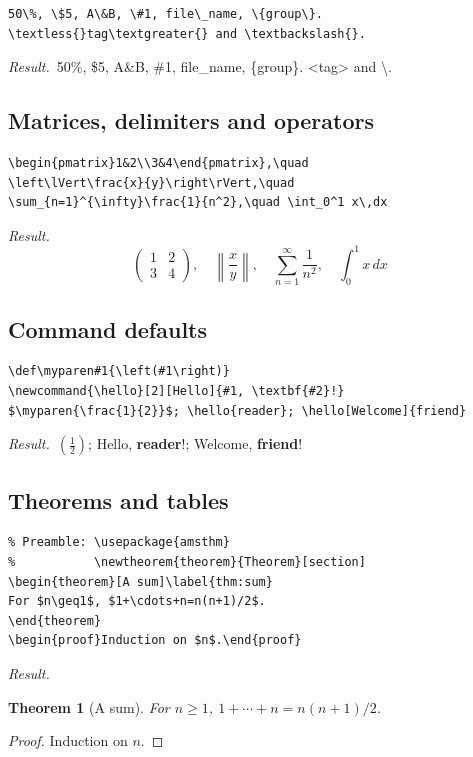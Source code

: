 \documentclass[11pt]{article}
\newtheorem{theorem}{Theorem}[section]
\newcommand{\result}{\par\noindent\textit{Result.}\ }
\begin{document}
\begin{verbatim}
50\%, \$5, A\&B, \#1, file\_name, \{group\}.
\textless{}tag\textgreater{} and \textbackslash{}.
\end{verbatim}
\result 50\%, \$5, A\&B, \#1, file\_name, \{group\}.
\textless{}tag\textgreater{} and \textbackslash{}.

\subsection{Matrices, delimiters and operators}
\begin{verbatim}
\begin{pmatrix}1&2\\3&4\end{pmatrix},\quad
\left\lVert\frac{x}{y}\right\rVert,\quad
\sum_{n=1}^{\infty}\frac{1}{n^2},\quad \int_0^1 x\,dx
\end{verbatim}
\result
\[\begin{pmatrix}1&2\\3&4\end{pmatrix},\quad
\left\lVert\frac{x}{y}\right\rVert,\quad
\sum_{n=1}^{\infty}\frac{1}{n^2},\quad\int_0^1x\,dx\]

\subsection{Command defaults}
\begin{verbatim}
\def\myparen#1{\left(#1\right)}
\newcommand{\hello}[2][Hello]{#1, \textbf{#2}!}
$\myparen{\frac{1}{2}}$; \hello{reader}; \hello[Welcome]{friend}
\end{verbatim}
\def\myparen#1{\left(#1\right)}
\newcommand{\hello}[2][Hello]{#1, \textbf{#2}!}
\result $\myparen{\frac{1}{2}}$; \hello{reader}; \hello[Welcome]{friend}

\subsection{Theorems and tables}
\begin{verbatim}
% Preamble: \usepackage{amsthm}
%           \newtheorem{theorem}{Theorem}[section]
\begin{theorem}[A sum]\label{thm:sum}
For $n\geq1$, $1+\cdots+n=n(n+1)/2$.
\end{theorem}
\begin{proof}Induction on $n$.\end{proof}
\end{verbatim}
\result
\begin{theorem}[A sum]\label{thm:sum}
For $n\geq1$, $1+\cdots+n=n(n+1)/2$.
\end{theorem}
\begin{proof}Induction on $n$.\end{proof}
\end{document}
